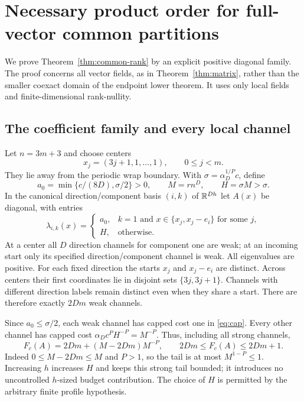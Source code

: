 \section{Necessary product order for full-vector common partitions}\label{sec:common-rank}
We prove Theorem~\ref{thm:common-rank} by an explicit positive diagonal
family. The proof concerns all vector fields, as in Theorem~\ref{thm:matrix},
rather than the smaller coexact domain of the endpoint lower theorem.
It uses only local fields and finite-dimensional rank-nullity.

\subsection{The coefficient family and every local channel}
Let $n=3m+3$ and choose centers
\[
 x_j=(3j+1,1,\ldots,1),\qquad 0\le j<m.
\]
They lie away from the periodic wrap boundary. With
$\sigma=\alpha_D^{1/P}c$, define
\[
 a_0=\min\{c/(8D),\sigma/2\}>0,\qquad
 M=r n^D,\qquad H=\sigma M>\sigma.
\]
In the canonical direction/component basis $(i,k)$ of $\mathbb R^{Dh}$ let
$A(x)$ be diagonal, with entries
\begin{equation}\label{eq:rank-profile}
 \lambda_{i,k}(x)=
 \begin{cases}
 a_0,&k=1\text{ and }x\in\{x_j,x_j-e_i\}\text{ for some }j,\\
 H,&\text{otherwise}.
 \end{cases}
\end{equation}
At a center all $D$ direction channels for component one are weak; at an
incoming start only its specified direction/component channel is weak.
All eigenvalues are positive. For each fixed direction the starts $x_j$
and $x_j-e_i$ are distinct. Across centers their first coordinates lie in
disjoint sets $\{3j,3j+1\}$. Channels with different direction labels remain
distinct even when they share a start. There are therefore exactly $2Dm$
weak channels.

Since $a_0\le\sigma/2$, each weak channel has capped cost one in
\eqref{eq:cap}. Every other channel has capped cost
$\alpha_Dc^PH^{-P}=M^{-P}$. Thus, including all strong channels,
\begin{equation}\label{eq:rank-budget}
 F_c(A)=2Dm+(M-2Dm)M^{-P},\qquad
 2Dm\le F_c(A)\le2Dm+1.
\end{equation}
Indeed $0\le M-2Dm\le M$ and $P>1$, so the tail is at most
$M^{1-P}\le1$. Increasing $h$ increases $H$ and keeps this strong tail
bounded; it introduces no uncontrolled $h$-sized budget contribution.
The choice of $H$ is permitted by the arbitrary finite profile hypothesis.


